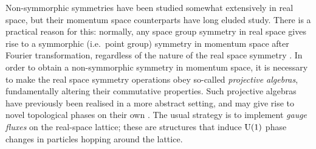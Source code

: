 Non-symmorphic symmetries have been studied somewhat extensively in real space, but their momentum space counterparts have long eluded study. There is a practical reason for this: normally, any space group symmetry in real space gives rise to a symmorphic (i.e.\ point group) symmetry in momentum space after Fourier transformation, regardless of the nature of the real space symmetry \cite{Zhang_nonsymmorphic}. In order to obtain a non-symmorphic symmetry in momentum space, it is necessary to make the real space symmetry operations obey so-called \emph{projective algebras}, fundamentally altering their commutative properties. Such projective algebras have previously been realised in a more abstract setting, and may give rise to novel topological phases on their own \cite{Shao_gauge,Xue-Wang_acoustic-Mobius,Li-Du_acoustic-Mobius,Chen_gauge-classification}. The usual strategy is to implement \emph{gauge fluxes} on the real-space lattice; these are structures that induce $\operatorname{U}(1)$ phase changes in particles hopping around the lattice.

